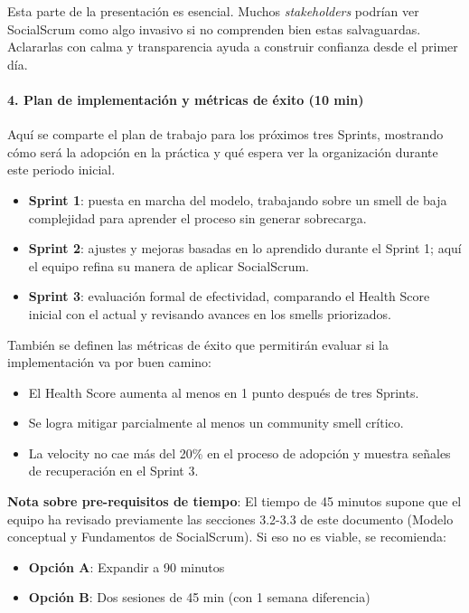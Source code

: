 Esta parte de la presentación es esencial. Muchos \textit{stakeholders} podrían ver SocialScrum como algo invasivo si no comprenden bien estas salvaguardas. Aclararlas con calma y transparencia ayuda a construir confianza desde el primer día.

\paragraph{4. Plan de implementación y métricas de éxito (10 min)}

Aquí se comparte el plan de trabajo para los próximos tres Sprints, mostrando cómo será la adopción en la práctica y qué espera ver la organización durante este periodo inicial.

\begin{itemize}
    \item \textbf{Sprint 1}: puesta en marcha del modelo, trabajando sobre un smell de baja complejidad para aprender el proceso sin generar sobrecarga.
    \item \textbf{Sprint 2}: ajustes y mejoras basadas en lo aprendido durante el Sprint 1; aquí el equipo refina su manera de aplicar SocialScrum.
    \item \textbf{Sprint 3}: evaluación formal de efectividad, comparando el Health Score inicial con el actual y revisando avances en los smells priorizados.
\end{itemize}

También se definen las métricas de éxito que permitirán evaluar si la implementación va por buen camino:

\begin{itemize}
    \item El Health Score aumenta al menos en 1 punto después de tres Sprints.
    \item Se logra mitigar parcialmente al menos un community smell crítico.
    \item La velocity no cae más del 20\% en el proceso de adopción y muestra señales de recuperación en el Sprint 3.
\end{itemize}

\textbf{Nota sobre pre-requisitos de tiempo}: El tiempo de 45 minutos supone que el equipo ha revisado previamente las secciones 3.2-3.3
de este documento (Modelo conceptual y Fundamentos de SocialScrum).
Si eso no es viable, se recomienda:

\begin{itemize}
    \item \textbf{Opción A}: Expandir a 90 minutos
    \item \textbf{Opción B}: Dos sesiones de 45 min (con 1 semana diferencia)
\end{itemize}

